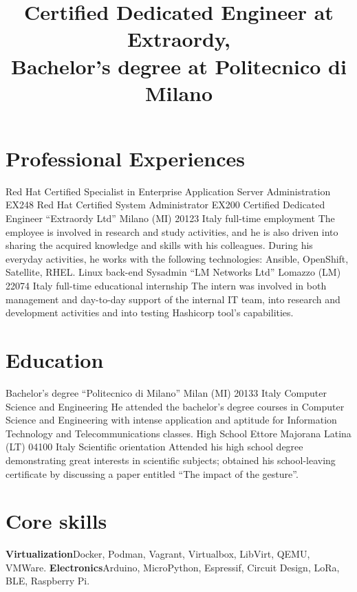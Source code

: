 
\title{\normalsize%
    Certified Dedicated Engineer at Extraordy,\\Bachelor's degree at Politecnico di Milano
}
\maketitle

\section{Professional Experiences}
    {Red Hat Certified Specialist in Enterprise Application Server Administration}
    {EX248}
    {}
    {}
    {}
    {Red Hat Certified System Administrator}
    {EX200}
    {}
    {}
    {}
    {Certified Dedicated Engineer}
    {``Extraordy Ltd''}
    {Milano (MI) 20123 Italy}
    {full-time employment}
    {The employee is involved in research and study activities, and he is also driven into sharing the acquired knowledge and skills with his colleagues. During his everyday activities, he works with the following technologies: Ansible, OpenShift, Satellite, RHEL.}
    {Linux back-end Sysadmin}
    {``LM Networks Ltd''}
    {Lomazzo (LM) 22074 Italy}
    {full-time educational internship}
    {The intern was involved in both management and day-to-day support of the internal IT team, into research and development activities and into testing Hashicorp tool's capabilities.}

\section{Education}
    {Bachelor's degree}
    {``Politecnico di Milano''}
    {Milan (MI) 20133 Italy}
    {Computer Science and Engineering}
    {He attended the bachelor's degree courses in Computer Science and Engineering with intense application and aptitude for Information Technology and Telecommunications classes.}
    {High School}
    {Ettore Majorana}
    {Latina (LT) 04100 Italy}
    {Scientific orientation}
    {Attended his high school degree demonstrating great interests in scientific subjects; obtained his school-leaving certificate by discussing a paper entitled ``The impact of the gesture''.}

\section{Core skills}
    {\textbf{Virtualization}}{Docker, Podman, Vagrant, Virtualbox, LibVirt, QEMU, VMWare.}
    {\textbf{Electronics}}{Arduino, MicroPython, Espressif, Circuit Design, LoRa, BLE, Raspberry Pi.}

